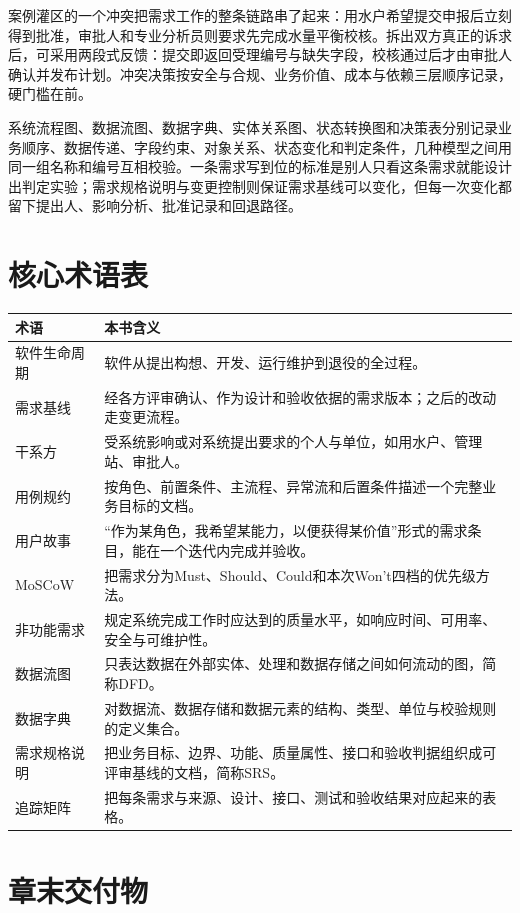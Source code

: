 案例灌区的一个冲突把需求工作的整条链路串了起来：用水户希望提交申报后立刻得到批准，审批人和专业分析员则要求先完成水量平衡校核。拆出双方真正的诉求后，可采用两段式反馈：提交即返回受理编号与缺失字段，校核通过后才由审批人确认并发布计划。冲突决策按安全与合规、业务价值、成本与依赖三层顺序记录，硬门槛在前。

系统流程图、数据流图、数据字典、实体关系图、状态转换图和决策表分别记录业务顺序、数据传递、字段约束、对象关系、状态变化和判定条件，几种模型之间用同一组名称和编号互相校验。一条需求写到位的标准是别人只看这条需求就能设计出判定实验；需求规格说明与变更控制则保证需求基线可以变化，但每一次变化都留下提出人、影响分析、批准记录和回退路径。

\section*{核心术语表}

\begin{longtable}{p{2.6cm}p{10.0cm}}
\toprule
术语 & 本书含义 \\
\midrule
软件生命周期 & 软件从提出构想、开发、运行维护到退役的全过程。 \\
需求基线 & 经各方评审确认、作为设计和验收依据的需求版本；之后的改动走变更流程。 \\
干系方 & 受系统影响或对系统提出要求的个人与单位，如用水户、管理站、审批人。 \\
用例规约 & 按角色、前置条件、主流程、异常流和后置条件描述一个完整业务目标的文档。 \\
用户故事 & “作为某角色，我希望某能力，以便获得某价值”形式的需求条目，能在一个迭代内完成并验收。 \\
MoSCoW & 把需求分为Must、Should、Could和本次Won't四档的优先级方法。 \\
非功能需求 & 规定系统完成工作时应达到的质量水平，如响应时间、可用率、安全与可维护性。 \\
数据流图 & 只表达数据在外部实体、处理和数据存储之间如何流动的图，简称DFD。 \\
数据字典 & 对数据流、数据存储和数据元素的结构、类型、单位与校验规则的定义集合。 \\
需求规格说明 & 把业务目标、边界、功能、质量属性、接口和验收判据组织成可评审基线的文档，简称SRS。 \\
追踪矩阵 & 把每条需求与来源、设计、接口、测试和验收结果对应起来的表格。 \\
\bottomrule
\end{longtable}

\section*{章末交付物}

